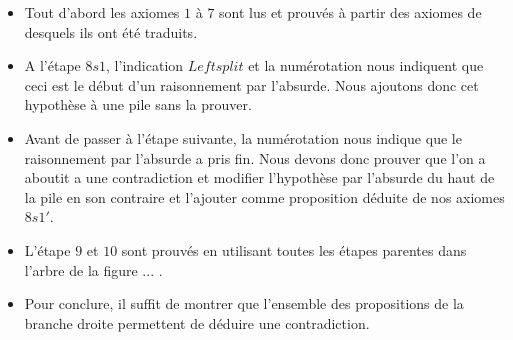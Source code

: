 \begin{itemize}
\item Tout d'abord les axiomes $1$ à $7$ sont lus et prouvés à partir des axiomes de \holfour desquels ils ont été traduits.
\item A l'étape $8s1$, l'indication $Leftsplit$ et la numérotation nous indiquent que ceci est le début d'un raisonnement par l'absurde. Nous ajoutons donc cet hypothèse à une pile sans la prouver.
\item Avant de passer à l'étape suivante, la numérotation nous indique que le raisonnement par l'absurde a pris fin. Nous devons donc prouver que l'on a aboutit a une contradiction et modifier l'hypothèse par l'absurde du haut de la pile en son contraire et l'ajouter comme proposition déduite de nos axiomes $8s1'$.
\item L'étape $9$ et $10$ sont prouvés en utilisant toutes les étapes parentes dans l'arbre de la figure ... .
\item Pour conclure, il suffit de montrer que l'ensemble des propositions de la branche droite permettent de déduire une contradiction.
\end{itemize}





